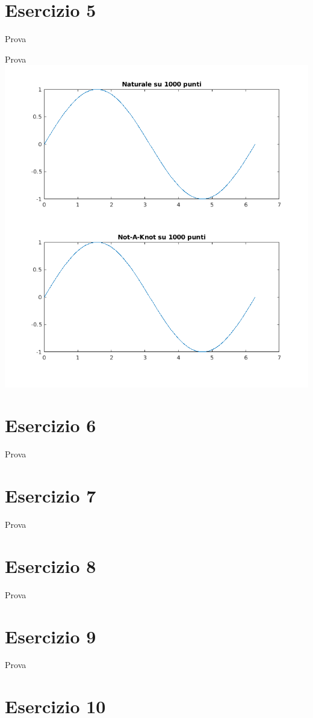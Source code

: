\documentclass[10pt,a4paper]{report}
\begin{document}
		\section{Esercizio 5}
			Prova
			
			Prova
			\includegraphics[width=\textwidth]{Grafici/Cap4/es5_spline.png}
		\section{Esercizio 6}
			Prova
			
		\section{Esercizio 7}
			Prova
		\section{Esercizio 8}
			Prova
		\section{Esercizio 9}
			Prova
		\section{Esercizio 10}
	
\end{document}
